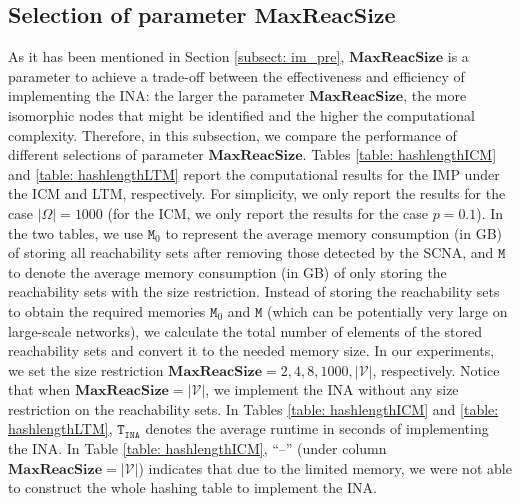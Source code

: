 \documentclass[a4paper,10pt]{article}
\newcommand{\maxlength}{\mathbf{MaxReacSize}}
\newcommand{\V}{\mathcal{V}}
\theoremstyle{plain}
\newcommand{\revv}[1]{{#1}}
\newcommand{\Mem}{{\texttt{M}}}
\newcommand{\TINA}{{\texttt{T}_\texttt{INA}}}
\begin{document}
\subsection{Selection of parameter $\maxlength$}
\label{subsec:parameter}



As it has been mentioned in \revv{Section} \ref{subsect: im_pre}, $\maxlength$ is a parameter to achieve a trade-off between the effectiveness and efficiency of implementing the INA: the larger the parameter $\maxlength$, the more isomorphic nodes that might be identified and the higher the computational complexity.
%
Therefore, in this subsection, we compare the performance of different selections of parameter $\maxlength$.
Tables \ref{table: hashlengthICM} and \ref{table: hashlengthLTM} report the computational results for the IMP under the ICM and LTM, respectively.
For simplicity, we only report the results for the case $|\Omega|=1000$ (for the ICM, we only report the results for the case $p=0.1$).
%
In the two tables, we use $\Mem_0$ to represent the average memory consumption (in GB) of storing all reachability sets after removing those detected by the SCNA,
and $\Mem$ to denote the average memory consumption (in GB) of only storing the reachability sets with the size restriction.
Instead of storing the reachability sets to obtain the required memories $\Mem_0$ and $\Mem$ (which can be potentially very  large on large-scale networks),
we calculate the total number of elements of the stored reachability sets and convert it to the needed memory size.
In our experiments, we set the size restriction $\maxlength=2,4,8,1000,|\V|$, respectively.
Notice that when $\maxlength=|\V|$, we implement the INA without any size restriction on the reachability sets.
%
\revv{In Tables \ref{table: hashlengthICM} and \ref{table: hashlengthLTM}, $\TINA$ denotes the average runtime in seconds of implementing the INA.}
%
\revv{In Table \ref{table: hashlengthICM}, ``--'' (under column $\maxlength=|\V|$) indicates that due to the limited memory, we were not able to construct the whole hashing table to implement the INA.}
\end{document}
